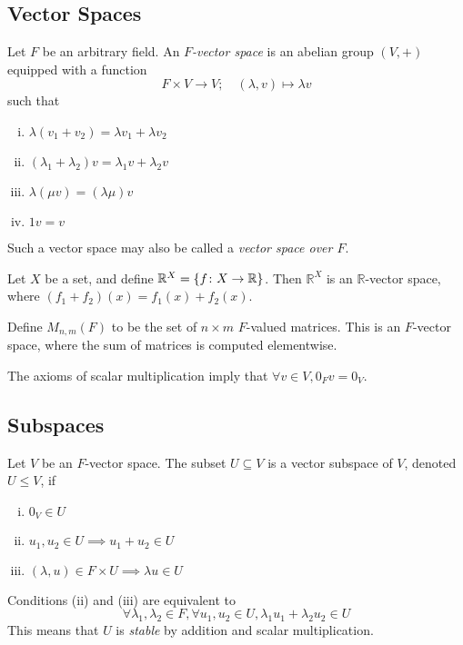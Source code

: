 \subsection{Vector Spaces}
\begin{definition}
Let \( F \) be an arbitrary field.
An \textit{\( F \)-vector space} is an abelian group \( (V, +) \) equipped with a function
\[ F \times V \to V;\quad (\lambda, v) \mapsto \lambda v \]
such that
\begin{enumerate}[(i)]
\item \( \lambda(v_1 + v_2) = \lambda v_1 + \lambda v_2 \)
\item \( (\lambda_1 + \lambda_2) v = \lambda_1 v + \lambda_2 v \)
\item \( \lambda ( \mu v ) = ( \lambda \mu ) v \)
\item \( 1 v = v \)
\end{enumerate}
Such a vector space may also be called a \textit{vector space over \( F \)}.
\end{definition}

\begin{example}
Let \( X \) be a set, and define \( \mathbb R^X = \qty{ f \colon X \to \mathbb R} \).
Then \( \mathbb R^X \) is an \( \mathbb R \)-vector space, where \( (f_1 + f_2)(x) = f_1(x) + f_2(x) \).
\end{example}

\begin{example}
Define \( M_{n,m}(F) \) to be the set of \( n \times m \) \( F \)-valued matrices.
This is an \( F \)-vector space, where the sum of matrices is computed elementwise.
\end{example}

\begin{remark}
The axioms of scalar multiplication imply that \( \forall v \in V, 0_F v = 0_V \).
\end{remark}

\subsection{Subspaces}
\begin{definition}
Let \( V \) be an \( F \)-vector space.
The subset \( U \subseteq V \) is a vector subspace of \( V \), denoted \( U \leq V \), if
\begin{enumerate}[(i)]
\item \( 0_V \in U \)
\item \( u_1, u_2 \in U \implies u_1 + u_2 \in U \)
\item \( (\lambda, u) \in F \times U \implies \lambda u \in U \)
\end{enumerate}
Conditions (ii) and (iii) are equivalent to
\[ \forall \lambda_1, \lambda_2 \in F, \forall u_1, u_2 \in U, \lambda_1 u_1 + \lambda_2 u_2 \in U \]
This means that \( U \) is \textit{stable} by addition and scalar multiplication.
\end{definition}

